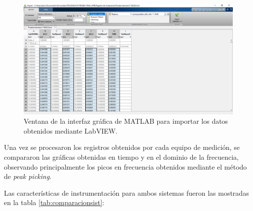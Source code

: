 \begin{figure}[H]
    \centering
    \includegraphics[width = \textwidth]{imagenes/cap3_resultados/Ensayos/datosmatlab.png}
    \caption{Ventana de la interfaz gráfica de MATLAB para importar los datos obtenidos mediante LabVIEW.}
    \label{fig:datosmatlab}
\end{figure}

Una vez se procesaron los registros obtenidos por cada equipo de medición, se compararon las gráficas obtenidas en tiempo y en el dominio de la frecuencia, observando principalmente los picos en frecuencia obtenidos mediante el método de \textit{peak picking}.

Las características de instrumentación para ambos sistemas fueron las mostradas en la tabla \ref{tab:comparacionsist}:
\begin{table}[H]
    \centering
    \caption{Comparación entre características de los sistemas de medición utilizados.}
    \label{tab:comparacionsist}
    \end{table}

